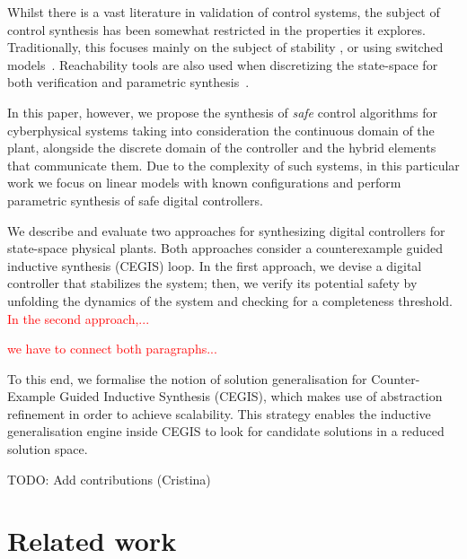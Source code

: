 \documentclass[runningheads,a4paper]{llncs}
\newcommand{\todo}[1]{{\color{red} TODO: #1}}
\begin{document}
Whilst there is a vast literature in validation of control systems,
the subject of control synthesis has been somewhat restricted in the
properties it explores.  Traditionally, this focuses mainly on the
subject of stability %
\cite{DBLP:journals/corr/AbateBCCDKK16,sadabadi2016static}, or using switched
models~\cite{DBLP:conf/emsoft/RavanbakhshS16}.
Reachability tools are
also used when discretizing the state-space for both verification and
parametric synthesis~\cite{cimatti2013parameter}.

In this paper, however, we propose the synthesis of \emph{safe} control algorithms for
cyberphysical systems taking into consideration the continuous domain
of the plant, alongside the discrete domain of the controller and the
hybrid elements that communicate them.
%
Due to the complexity of such systems, in this particular work we focus
on linear models with known configurations and perform parametric synthesis
of safe digital controllers.

We describe and evaluate two approaches for synthesizing digital controllers 
for state-space physical plants. Both approaches consider a counterexample 
guided inductive synthesis (CEGIS) loop. In the first approach, 
we devise a digital controller that stabilizes the system; then, we verify its 
potential safety by unfolding the dynamics of the system and checking for 
a completeness threshold. \textcolor{red}{In the second approach,...}

\textcolor{red}{we have to connect both paragraphs...}

To this end, we formalise the notion of solution generalisation for
Counter-Example Guided Inductive Synthesis (CEGIS), which makes use 
of abstraction refinement in order to achieve scalability.
This strategy enables the inductive generalisation engine inside CEGIS
to look for candidate solutions in a reduced solution space.  



\todo{Add contributions (Cristina)}

\section{Related work}
\label{sec:relw}
\end{document}
